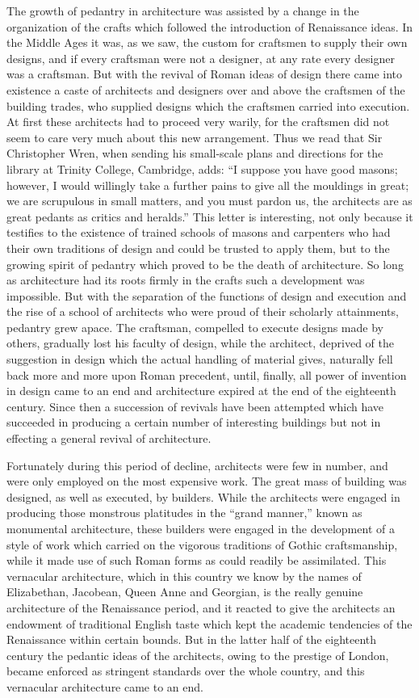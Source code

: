\documentclass{book}
\begin{document}
The growth of pedantry in architecture was assisted by a change in the organization of the crafts which followed the introduction of Renaissance ideas. In the Middle Ages it was, as we saw, the custom for craftsmen to supply their own designs, and if every craftsman were not a designer, at any rate every designer was a craftsman. But with the revival of Roman ideas of design there came into existence a caste of architects and designers over and above the craftsmen of the building trades, who supplied designs which the craftsmen carried into execution. At first these architects had to proceed very warily, for the craftsmen did not seem to care very much about this new arrangement. Thus we read that Sir Christopher Wren, when sending his small-scale plans and directions for the library at Trinity College, Cambridge, adds: “I suppose you have good masons; however, I would willingly take a further pains to give all the mouldings in great; we are scrupulous in small matters, and you must pardon us, the architects are as great pedants as critics and heralds.” This letter is interesting, not only because it testifies to the existence of trained schools of masons and carpenters who had their own traditions of design and could be trusted to apply them, but to the growing spirit of pedantry which proved to be the death of architecture. So long as architecture had its roots firmly in the crafts such a development was impossible. But with the separation of the functions of design and execution and the rise of a school of architects who were proud of their scholarly attainments, pedantry grew apace. The craftsman, compelled to execute designs made by others, gradually lost his faculty of design, while the architect, deprived of the suggestion in design which the actual handling of material gives, naturally fell back more and more upon Roman precedent, until, finally, all power of invention in design came to an end and architecture expired at the end of the eighteenth century. Since then a succession of revivals have been attempted which have succeeded in producing a certain number of interesting buildings but not in effecting a general revival of architecture.

Fortunately during this period of decline, architects were few in number, and were only employed on the most expensive work. The great mass of building was designed, as well as executed, by builders. While the architects were engaged in producing those monstrous platitudes in the “grand manner,” known as monumental architecture, these builders were engaged in the development of a style of work which carried on the vigorous traditions of Gothic craftsmanship, while it made use of such Roman forms as could readily be assimilated. This vernacular architecture, which in this country we know by the names of Elizabethan, Jacobean, Queen Anne and Georgian, is the really genuine architecture of the Renaissance period, and it reacted to give the architects an endowment of traditional English taste which kept the academic tendencies of the Renaissance within certain bounds. But in the latter half of the eighteenth century the pedantic ideas of the architects, owing to the prestige of London, became enforced as stringent standards over the whole country, and this vernacular architecture came to an end.
\end{document}
